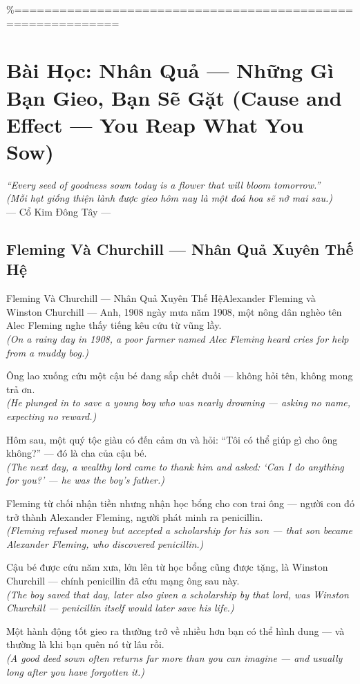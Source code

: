 \%============================================================
\chapter{Bài Học: Nhân Quả --- Những Gì Bạn Gieo, Bạn Sẽ Gặt (Cause and Effect --- You Reap What You Sow)}
\begin{center}
  \textit{\color{truyengold}``Every seed of goodness sown today is a flower that will bloom tomorrow.''}\\[4pt]
  \textit{(Mỗi hạt giống thiện lành được gieo hôm nay là một đoá hoa sẽ nở mai sau.)}\\[4pt]
  \small\color{truyenblue}--- Cổ Kim Đông Tây ---
\end{center}
\ngancach

\section{Fleming Và Churchill --- Nhân Quả Xuyên Thế Hệ}
\begin{truyen}{Fleming Và Churchill --- Nhân Quả Xuyên Thế Hệ}{Alexander Fleming và Winston Churchill --- Anh, 1908}
 ngày mưa năm 1908, một nông dân nghèo tên Alec Fleming nghe thấy tiếng kêu cứu từ vũng lầy.\\[4pt]
\textit{(On a rainy day in 1908, a poor farmer named Alec Fleming heard cries for help from a muddy bog.)}

Ông lao xuống cứu một cậu bé đang sắp chết đuối --- không hỏi tên, không mong trả ơn.\\[4pt]
\textit{(He plunged in to save a young boy who was nearly drowning --- asking no name, expecting no reward.)}

Hôm sau, một quý tộc giàu có đến cảm ơn và hỏi: ``Tôi có thể giúp gì cho ông không?'' --- đó là cha của cậu bé.\\[4pt]
\textit{(The next day, a wealthy lord came to thank him and asked: `Can I do anything for you?' --- he was the boy's father.)}

Fleming từ chối nhận tiền nhưng nhận học bổng cho con trai ông --- người con đó trở thành Alexander Fleming, người phát minh ra penicillin.\\[4pt]
\textit{(Fleming refused money but accepted a scholarship for his son --- that son became Alexander Fleming, who discovered penicillin.)}

Cậu bé được cứu năm xưa, lớn lên từ học bổng cũng được tặng, là Winston Churchill --- chính penicillin đã cứu mạng ông sau này.\\[4pt]
\textit{(The boy saved that day, later also given a scholarship by that lord, was Winston Churchill --- penicillin itself would later save his life.)}

\end{truyen}
\begin{baihoc}
  Một hành động tốt gieo ra thường trở về nhiều hơn bạn có thể hình dung --- và thường là khi bạn quên nó từ lâu rồi.\\[4pt]
  \textit{(A good deed sown often returns far more than you can imagine --- and usually long after you have forgotten it.)}
\end{baihoc}

